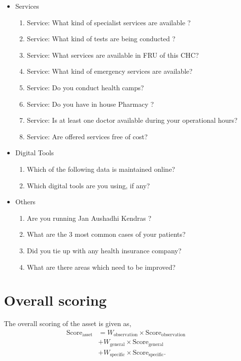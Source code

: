 \documentclass[oneside]{article}
\newcommand{\tsub}[2]{\text{#1}_{\text{#2}}}
\newcommand{\tsubb}[2]{#1_{\text{#2}}}
\begin{document}
\begin{itemize}
\begin{itemize}
\item Services
\begin{enumerate}
\item Service: What kind of specialist services are available ?
\item Service: What kind of tests are being conducted ?
\item Service: What services are available in FRU of this CHC?
\item Service: What kind of emergency services are available?
\item Service: Do you conduct health camps?
\item Service: Do you have in house Pharmacy ?
\item Service: Is at least one doctor available during your operational hours?
\item Service: Are offered services free of cost?
\end{enumerate}

\item Digital Tools
\begin{enumerate}
\item  Which of the following data is maintained online?
\item  Which digital tools are you using, if any?
\end{enumerate}

\item Others
\begin{enumerate}
\item  Are you running Jan Aushadhi Kendras ?
\item  What are the 3 most common cases of your patients?
\item  Did you tie up with any health insurance company?
\item  What are there areas which need to be improved?
\end{enumerate}

\end{itemize}

    \end{itemize}
\section{Overall scoring}
The overall scoring of the asset is given as,
\begin{align*}
	\tsub{Score}{asset} &= \tsubb{W}{observation} \times \tsub{Score}{observation} \\
	&+ \tsubb{W}{general} \times \tsub{Score}{general} \\
	&+ \tsubb{W}{specific} \times \tsub{Score}{specific}.
\end{align*}
\end{document}
